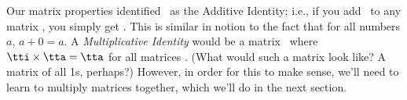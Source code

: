 \medskip

Our matrix properties identified \tto\ as the Additive Identity; i.e., if you add \tto\ to any matrix \tta, you simply get \tta. This is similar in notion to the fact that for all numbers $a$, $a+0 = a$. A \textit{Multiplicative Identity} would be a matrix \tti\ where $\tti\times\tta = \tta$ for all matrices \tta. (What would such a matrix look like? A matrix of all 1s, perhaps?) However, in order for this to make sense, we'll need to learn to multiply matrices together, which we'll do in the next section. \\





